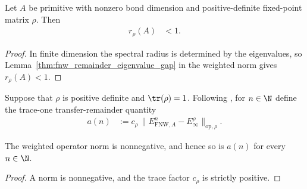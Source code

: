\begin{lemma}
    \label{thm:fnw_weighted_remainder_spectral_radius_lt_one}
    \leanok
    Let $A$ be primitive with nonzero bond dimension and positive-definite
    fixed-point matrix $\rho$.  Then
    \begin{align}
        r_\rho(A) & <1.
        \label{eq:fnw_weighted_remainder_spectral_radius_lt_one}
    \end{align}
\end{lemma}

\begin{proof}
    \leanok
    In finite dimension the spectral radius is determined by the eigenvalues,
    so Lemma~\ref{thm:fnw_remainder_eigenvalue_gap} in the weighted norm
    gives $r_\rho(A)<1$.
\end{proof}

\begin{definition}
    \label{def:fnw_mixing_quantity}
    \leanok
    Suppose that $\rho$ is positive definite and $\tr(\rho)=1$.  Following
    \cite[Equations~(5.9)--(5.10)]{Fannes1992Finitely}, for $n\in\N$ define the
    trace-one transfer-remainder quantity
    \begin{align}
        a(n)
         & :=c_\rho\,
        \bigl\lVert E_{\mathrm{FNW},A}^n-E_\infty^\rho
        \bigr\rVert_{\mathrm{op},\rho}.
        \label{eq:fnw_mixing_quantity}
    \end{align}
\end{definition}

\begin{lemma}
    \label{thm:fnw_mixing_quantity_nonneg}
    \leanok
    The weighted operator norm is nonnegative, and hence so is $a(n)$ for every
    $n\in\N$.
\end{lemma}

\begin{proof}
    \leanok
    A norm is nonnegative, and the trace factor $c_\rho$ is strictly positive.
\end{proof}

